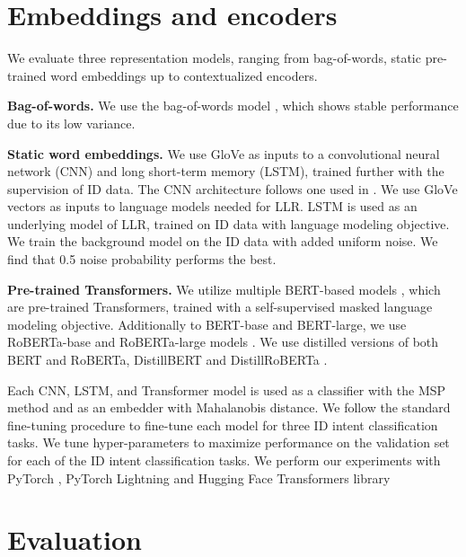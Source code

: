 \documentclass[letterpaper, final]{article} %
\begin{document}
\section{Embeddings and encoders}

We evaluate three representation models, ranging from bag-of-words, static pre-trained word embeddings up to contextualized encoders.

{\bf Bag-of-words.} We use the bag-of-words model \cite{haris_bow}, which shows stable performance due to its low variance.

{\bf Static word embeddings.} We use GloVe \cite{pennington2014glove} as inputs to a convolutional neural network (CNN) and long short-term memory (LSTM), trained further with the supervision of ID data. The CNN architecture follows one used in \cite{zheng2020out}.  We use GloVe vectors as inputs to language models needed for LLR. LSTM is used as an underlying model of LLR, trained on ID data with language modeling objective. We train the background model on the ID data with added uniform noise. We find that 0.5 noise probability performs the best.

{\bf Pre-trained Transformers.} We utilize multiple BERT-based models \cite{devlin2019bert}, which are pre-trained Transformers, trained with a self-supervised masked language modeling objective. Additionally to BERT-base and BERT-large, we use RoBERTa-base and RoBERTa-large models \cite{liu2019roberta}. We use distilled versions of both BERT and RoBERTa, DistillBERT and DistillRoBERTa \cite{sanh2019distilbert}.


Each CNN, LSTM, and Transformer model is used as a classifier with the MSP method and as an embedder with Mahalanobis distance. We follow the standard fine-tuning procedure to fine-tune each model for three ID intent classification tasks.  We tune hyper-parameters to maximize performance on the validation set for each of the ID intent classification tasks. We perform our experiments with PyTorch \cite{paszke2019pytorch}, PyTorch Lightning \cite{falcon2019pytorch} and Hugging Face Transformers library \cite{wolf2019huggingface}


\section{Evaluation}
\end{document}
